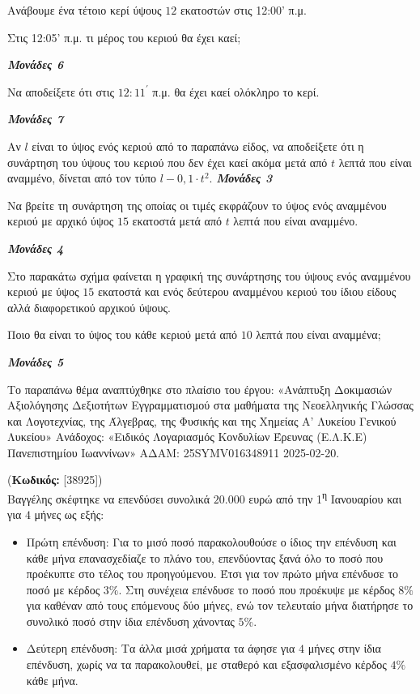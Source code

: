 \documentclass[11pt,a4paper,twoside]{book}
\newcounter{askhsh}[chapter]
\renewcommand{\theaskhsh}{
	\bf{\titlefont{\Large{\thechapter}}.\arabic{askhsh}}
}
\newcommand{\Askhsh}[2]{\refstepcounter{askhsh}{\titlefont{Άσκηση\theaskhsh} - \textcolor{maincolor}{ΘΕΜΑ #2}} (\small{\textbf{Κωδικός:} #1})\\}{}
\newcommand{\monades}[1]{
\hspace*{\fill}
\textbf{\textit{\textcolor{maincolor}{Μονάδες #1}}}}
\begin{document}
\begin{alist}
\item Ανάβουμε ένα τέτοιο κερί ύψους $12$ εκατοστών στις 12:00' π.μ.

\begin{rlist}
\item Στις 12:05' π.μ. τι μέρος του κεριού θα έχει καεί;
\monades{6}
\item Να αποδείξετε ότι στις $12:11^{'}$ π.μ. θα έχει καεί ολόκληρο το κερί.
\monades{7}
\end{rlist}
\item Αν $l$ είναι το ύψος ενός κεριού από το παραπάνω είδος, να αποδείξετε ότι η συνάρτηση του ύψους του κεριού που δεν έχει καεί ακόμα μετά από $t$ λεπτά που είναι αναμμένο, δίνεται από τον τύπο $l - 0,1 \cdot t^{2}$.\monades{3}
\item

\begin{rlist}
\item Να βρείτε τη συνάρτηση της οποίας οι τιμές εκφράζουν το ύψος ενός αναμμένου κεριού με αρχικό ύψος $15$ εκατοστά μετά από $t$ λεπτά που είναι αναμμένο.
\monades{4}
\item Στο παρακάτω σχήμα φαίνεται η γραφική της συνάρτησης του ύψους ενός αναμμένου κεριού με ύψος $15$ εκατοστά και ενός δεύτερου αναμμένου κεριού του ίδιου είδους αλλά διαφορετικού αρχικού ύψους.


Ποιο θα είναι το ύψος του κάθε κεριού μετά από $10$ λεπτά που είναι αναμμένα;
\monades{5}

{\footnotesize Το παραπάνω θέμα αναπτύχθηκε στο πλαίσιο του έργου: «Ανάπτυξη Δοκιμασιών Αξιολόγησης Δεξιοτήτων Εγγραμματισμού στα μαθήματα της Νεοελληνικής Γλώσσας και Λογοτεχνίας, της Άλγεβρας, της Φυσικής και της Χημείας Α' Λυκείου Γενικού Λυκείου» Ανάδοχος: «Ειδικός Λογαριασμός Κονδυλίων Έρευνας (Ε.Λ.Κ.Ε) Πανεπιστημίου Ιωαννίνων» ΑΔΑΜ: 25SYMV016348911 2025-02-20.}
\end{rlist}
\end{alist}

\vspace{4mm}

\Askhsh{[38925]}
Ο Βαγγέλης σκέφτηκε να επενδύσει συνολικά $20.000$ ευρώ από την 1\textsuperscript{η} Ιανουαρίου και για $4$ μήνες ως εξής:

\begin{itemize}
\item
  Πρώτη επένδυση: Για το μισό ποσό παρακολουθούσε ο ίδιος την επένδυση και κάθε μήνα επανασχεδίαζε το πλάνο του, επενδύοντας ξανά όλο το ποσό που προέκυπτε στο τέλος του προηγούμενου. Έτσι για τον πρώτο μήνα επένδυσε το ποσό με κέρδος $3\%$. Στη συνέχεια επένδυσε το ποσό που προέκυψε με κέρδος $8\%$ για καθέναν από τους επόμενους δύο μήνες, ενώ τον τελευταίο μήνα διατήρησε το συνολικό ποσό στην ίδια επένδυση χάνοντας $5$\%.
\item
  Δεύτερη επένδυση: Τα άλλα μισά χρήματα τα άφησε για $4$ μήνες στην ίδια επένδυση, χωρίς να τα παρακολουθεί, με σταθερό και εξασφαλισμένο κέρδος $4\%$ κάθε μήνα.
\end{itemize}
\end{document}
